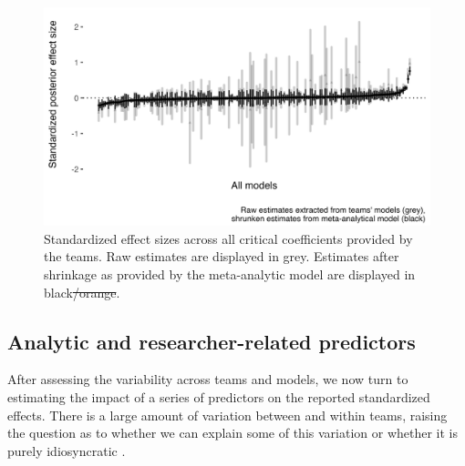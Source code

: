 \documentclass[Review,times,sageh]{sagej}
\providecommand{\DIFdeltex}[1]{{\protect\color{red}\sout{#1}}}                      %
\providecommand{\DIFdelFL}[1]{\DIFdel{#1}} %
\providecommand{\DIFdelbeginFL}{} %
\providecommand{\DIFdelendFL}{} %
\providecommand{\DIFdel}[1]{\texorpdfstring{\DIFdeltex{#1}}{}} %
\begin{document}
\begin{figure}
\includegraphics[width=1\linewidth]{../figs/meta_plot1_shrinkage} \caption{Standardized effect sizes across all critical coefficients provided by the teams. Raw estimates are displayed in grey. Estimates after shrinkage as provided by the meta-analytic model are displayed in black\DIFdelbeginFL \DIFdelFL{/orange}\DIFdelendFL .}\label{fig:plot-meta1}
\end{figure}

\hypertarget{analytic-and-researcher-related-predictors}{%
\subsection{Analytic and researcher-related predictors}\label{analytic-and-researcher-related-predictors}}

After assessing the variability across teams and models, we now turn to estimating the impact of a series of predictors on the reported standardized effects.
There is a large amount of variation between and within teams, raising the question as to whether we can explain some of this variation or whether it is purely idiosyncratic \citep{breznau2021observing}.
\end{document}

